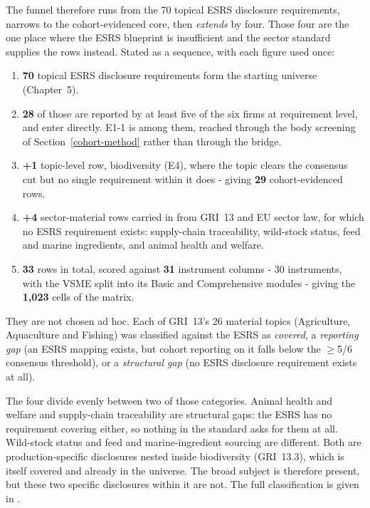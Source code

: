 The funnel therefore runs from the 70 topical ESRS disclosure requirements, narrows
to the cohort-evidenced core, then \emph{extends} by four. Those four are the one
place where the ESRS blueprint is insufficient and the sector standard supplies the
rows instead. Stated as a sequence, with each figure used once:

\begin{enumerate}\itemsep2pt
\item \textbf{70} topical ESRS disclosure requirements form the starting universe
(Chapter~5).
\item \textbf{28} of those are reported by at least five of the six firms at
requirement level, and enter directly. E1-1 is among them, reached through the
body screening of Section~\ref{cohort-method} rather than through the bridge.
\item \textbf{+1} topic-level row, biodiversity (E4), where the topic clears the
consensus cut but no single requirement within it does - giving \textbf{29}
cohort-evidenced rows.
\item \textbf{+4} sector-material rows carried in from GRI~13 and EU sector law,
for which no ESRS requirement exists: supply-chain traceability, wild-stock
status, feed and marine ingredients, and animal health and welfare.
\item \textbf{33} rows in total, scored against \textbf{31} instrument columns -
30 instruments, with the VSME split into its Basic and Comprehensive modules -
giving the \textbf{1{,}023} cells of the matrix.
\end{enumerate}

They are not chosen ad hoc. Each of GRI~13's 26 material topics
(Agriculture, Aquaculture and Fishing) was classified against the ESRS as
\emph{covered}, a \emph{reporting gap} (an ESRS mapping exists, but cohort
reporting on it falls below the $\geq$5/6 consensus threshold), or a
\emph{structural gap} (no ESRS disclosure requirement exists at all).

The four divide evenly between two of those categories. Animal health and welfare
and supply-chain traceability are structural gaps: the ESRS has no requirement
covering either, so nothing in the standard asks for them at all. Wild-stock
status and feed and marine-ingredient sourcing are different. Both are
production-specific disclosures nested inside biodiversity (GRI~13.3), which is
itself covered and already in the universe. The broad subject is therefore
present, but these two specific disclosures within it are not. The full
classification is given in .

